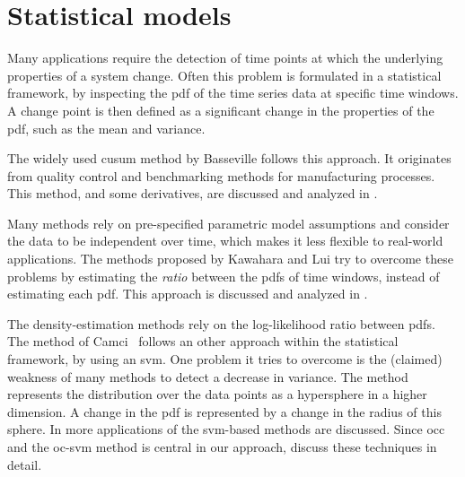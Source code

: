 \section{Statistical models}\label{sec:literature_review_statistical_models}
Many applications require the detection of time points at which the underlying properties of a system change.
Often this problem is formulated in a statistical framework, by inspecting the \gls{pdf} of the time series data at specific time windows.
A change point is then defined as a significant change in the properties of the \gls{pdf}, such as the mean and variance.

The widely used \gls{cusum} method by Basseville \etal \cite{basseville1993detection} follows this approach.
It originates from quality control and benchmarking methods for manufacturing processes.
This method, and some derivatives, are discussed and analyzed in .

Many methods rely on pre-specified parametric model assumptions and consider the data to be independent over time, which makes it less flexible to real-world applications.
The methods proposed by Kawahara \etal \cite{kawahara2009change} and Lui \etal \cite{liu2013change} try to overcome these problems by estimating the \emph{ratio} between the \glspl{pdf} of time windows, instead of estimating each \gls{pdf}.
This approach is discussed and analyzed in .

The density-estimation methods rely on the log-likelihood ratio between \glspl{pdf}.
The method of Camci~\cite{camci2010change} follows an other approach within the statistical framework, by using an \gls{svm}.
One problem it tries to overcome is the (claimed) weakness of many methods to detect a decrease in variance.
The method represents the distribution over the data points as a hypersphere in a higher dimension.
A change in the \gls{pdf} is represented by a change in the radius of this sphere.
In  more applications of the \gls{svm}-based methods are discussed.
Since \gls{occ} and the \gls{oc-svm} method is central in our approach,  discuss these techniques in detail.

